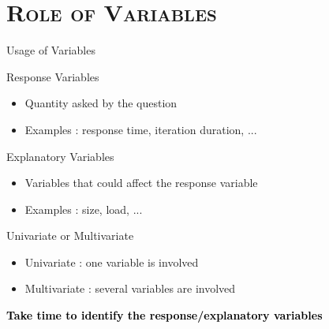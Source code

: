\documentclass[xcolor=x11names,compress,8pt,
handout
]{beamer}
\renewcommand{\(}{\begin{columns}}
\renewcommand{\)}{\end{columns}}
\newcommand{\<}[1]{\begin{column}{#1}}
\renewcommand{\>}{\end{column}}
\begin{document}
\section[{\scshape Role of Variables}]{{\scshape Role of Variables} }
\begin{frame}{Usage of  Variables}

\begin{alertblock}{Response Variables }
\begin{itemize}
\item Quantity   asked by the  question 
\item Examples : response time, iteration duration, ...
\end{itemize}
\end{alertblock}
\pause
\begin{alertblock}{Explanatory Variables}
\begin{itemize}
\item Variables that could affect the response variable
\item Examples : size, load, ...
\end{itemize}
\end{alertblock}
\pause
\begin{alertblock}{Univariate or Multivariate}
\begin{itemize}
\item Univariate : one variable is involved
\item Multivariate : several variables are involved
\end{itemize}
\end{alertblock}
\vfill

\centerline{\colorbox{yellow!85}{\textcolor{black}{\textbf{\large Take time to identify the response/explanatory variables }}}}
\end{frame}
\end{document}

